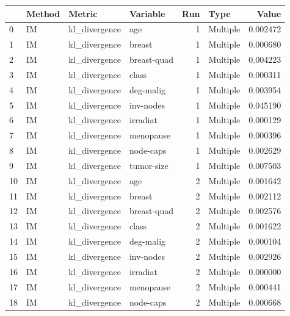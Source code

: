 \begin{tabular}{llllrlr}
\toprule
{} &   Method &                 Metric &     Variable &  Run &      Type &     Value \\
\midrule
0   &       IM &          kl\_divergence &          age &    1 &  Multiple &  0.002472 \\
1   &       IM &          kl\_divergence &       breast &    1 &  Multiple &  0.000680 \\
2   &       IM &          kl\_divergence &  breast-quad &    1 &  Multiple &  0.004223 \\
3   &       IM &          kl\_divergence &        class &    1 &  Multiple &  0.000311 \\
4   &       IM &          kl\_divergence &    deg-malig &    1 &  Multiple &  0.003954 \\
5   &       IM &          kl\_divergence &    inv-nodes &    1 &  Multiple &  0.045190 \\
6   &       IM &          kl\_divergence &     irradiat &    1 &  Multiple &  0.000129 \\
7   &       IM &          kl\_divergence &    menopause &    1 &  Multiple &  0.000396 \\
8   &       IM &          kl\_divergence &    node-caps &    1 &  Multiple &  0.002629 \\
9   &       IM &          kl\_divergence &   tumor-size &    1 &  Multiple &  0.007503 \\
10  &       IM &          kl\_divergence &          age &    2 &  Multiple &  0.001642 \\
11  &       IM &          kl\_divergence &       breast &    2 &  Multiple &  0.002112 \\
12  &       IM &          kl\_divergence &  breast-quad &    2 &  Multiple &  0.002576 \\
13  &       IM &          kl\_divergence &        class &    2 &  Multiple &  0.001622 \\
14  &       IM &          kl\_divergence &    deg-malig &    2 &  Multiple &  0.000104 \\
15  &       IM &          kl\_divergence &    inv-nodes &    2 &  Multiple &  0.002926 \\
16  &       IM &          kl\_divergence &     irradiat &    2 &  Multiple &  0.000000 \\
17  &       IM &          kl\_divergence &    menopause &    2 &  Multiple &  0.000441 \\
18  &       IM &          kl\_divergence &    node-caps &    2 &  Multiple &  0.000668 \\

\end{tabular}
